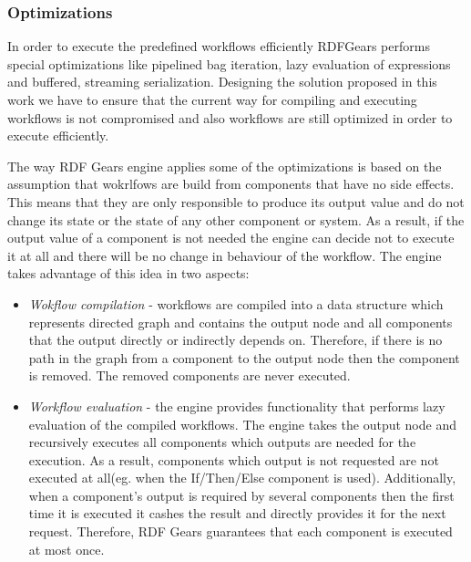 \subsubsection{Optimizations}

In order to execute the predefined workflows efficiently RDFGears performs special optimizations like pipelined bag iteration, lazy evaluation of expressions and buffered, streaming serialization. Designing the solution proposed in this work we have to ensure that the current way for compiling and executing workflows is not compromised and also workflows are still optimized in order to execute efficiently. 

The way RDF Gears engine applies some of the optimizations is based on the assumption that wokrlfows are build from components that have no side effects. This means that they are only responsible to produce its output value and do not change its state or the state of any other component or system. As a result, if the output value of a component is not needed the engine can decide not to execute it at all and there will be no change in behaviour of the workflow. The engine takes advantage of this idea in two aspects:
	\begin{itemize}
		\item \textit{Wokflow compilation} - workflows are compiled into a data structure which represents directed graph and contains the output node and all components that the output directly or indirectly depends on. Therefore, if there is no path in the graph from a component to the output node then the component is removed. The removed components are never executed.
		
		\item \textit{Workflow evaluation} - the engine provides functionality that performs lazy evaluation of the compiled workflows. The engine takes the output node and recursively executes all components which outputs are needed for the execution. As a result, components which output is not requested are not executed at all(eg. when the If/Then/Else component is used). Additionally, when a component's output is required by several components then the first time it is executed it cashes the result and directly provides it for the next request. Therefore, RDF Gears guarantees that each component is executed at most once.
\end{itemize}
